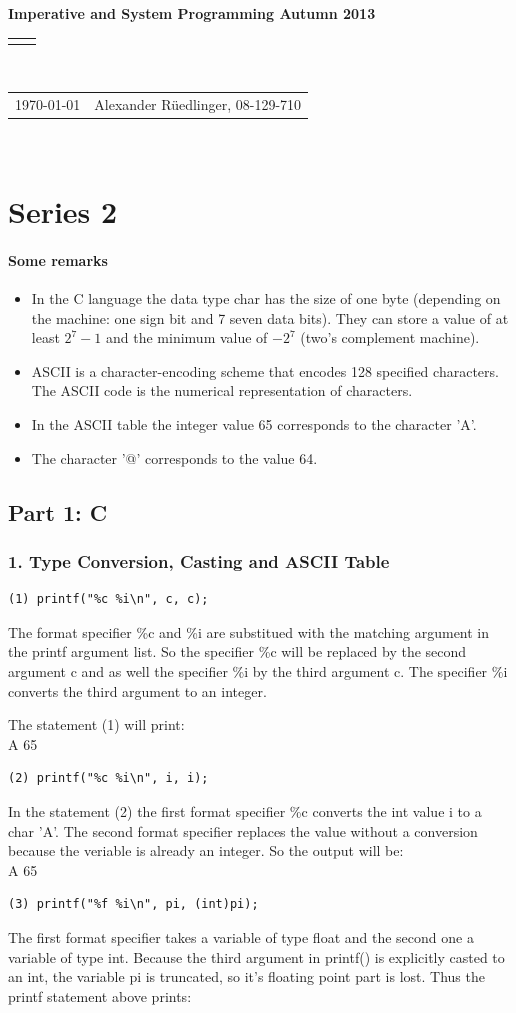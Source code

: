 \documentclass[12pt]{article}
\renewcommand{\title}[1]{\textbf{#1}\\}
\renewcommand{\line}{\begin{tabularx}{\textwidth}{X>{\raggedleft}X}\hline\\\end{tabularx}\\[-0.5cm]}
\newcommand{\leftright}[2]{\begin{tabularx}{\textwidth}{X>{\raggedleft}X}#1%
& #2\\\end{tabularx}\\[-0.5cm]}
\begin{document}
\title{Imperative and System Programming Autumn 2013}
\line
\leftright{\today}{Alexander Rüedlinger, 08-129-710} %
\section*{Series 2}
\paragraph{Some remarks}
\begin{itemize}
\item In the C language the data type char has the size of one byte (depending on the machine: one sign bit and 7 seven data bits). They can store a value of at least $2^7-1$ and the minimum value of $-2^7$ (two's complement machine).
\item ASCII is a character-encoding scheme that encodes 128 specified characters. The ASCII code is the numerical representation of characters.
\item In the ASCII table the integer value 65 corresponds to the character 'A'.
\item The character '@' corresponds to the value 64.
\end{itemize}

\subsection*{Part 1: C}
\subsubsection*{1. Type Conversion, Casting and ASCII Table}
\begin{lstlisting}
(1) printf("%c %i\n", c, c);
\end{lstlisting}

The format specifier \%c and \%i are substitued with the matching argument in the printf argument list. 
So the specifier \%c will be replaced by the second argument c and as well the specifier \%i by the third argument c. The specifier \%i converts the third argument to an integer.

The statement (1) will print:\\
A 65
\\
\begin{lstlisting}
(2) printf("%c %i\n", i, i);
\end{lstlisting}
In the statement (2) the first format specifier \%c converts the int value i to a char 'A'. The second format specifier replaces the value without a conversion because the veriable is already an integer.
So the output will be:\\
A 65
\\
\begin{lstlisting}
(3) printf("%f %i\n", pi, (int)pi);
\end{lstlisting}
The first format specifier takes a variable of type float and the second one a variable of type int.
Because the third argument in printf() is explicitly casted to an int, the variable pi is truncated, so it's floating point part is lost. Thus the printf statement above prints:
\end{document}
